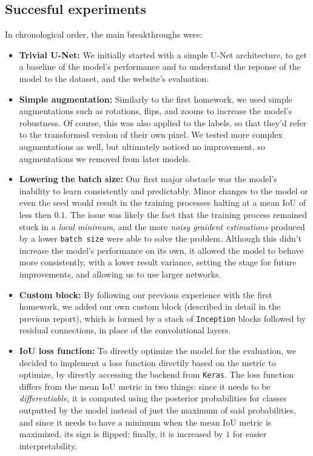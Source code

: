\documentclass[11pt]{article}
\begin{document}
\begin{multicols}{2}
      \section{Succesful experiments}
      \label{sec:succ_experiments}
      In chronological order, the main breakthroughs were:
      \begin{itemize}[leftmargin=*]
            \setlength\itemsep{0em}
            \item \textbf{Trivial U-Net:} We initially started with a simple U-Net architecture, to get a baseline of the model's performance and to understand the reponse of the model to the dataset, and the website's evaluation.
            \item \textbf{Simple augmentation:} Similarly to the first homework, we used simple augmentations such as rotations, flips, and zooms to increase the model's robustness. Of course, this was also applied to the labels, so that they'd refer to the transformed version of their own pixel. We tested more complex augmentations as well, but ultimately noticed no improvement, so augmentations we removed from later models.
            \item \textbf{Lowering the batch size:} Our first major obstacle was the model's inability to learn consistently and predictably. Minor changes to the model or even the seed would result in the training processes halting at a mean IoU of less then $0.1$. The issue was likely the fact that the training process remained stuck in a \textit{local minimum}, and the more \textit{noisy graident estimations} produced by a lower \texttt{batch size} were able to solve the problem. Although this didn't increase the model's performance on its own, it allowed the model to behave more consistently, with a lower result variance, setting the stage for future improvements, and allowing us to use larger networks.
            \item \textbf{Custom block:} By following our previous experience with the first homework, we added our own custom block (described in detail in the previous report), which is formed by a stack of \texttt{Inception} blocks followed by residual connections, in place of the convolutional layers.
            \item \textbf{IoU loss function:} To directly optimize the model for the evaluation, we decided to implement a loss function directily based on the metric to optimize, by directly accessing the backend from \texttt{Keras}. The loss function differs from the mean IoU metric in two things: since it needs to be \textit{differentiable}, it is computed using the posterior probabilities for classes outputted by the model instead of just the maximum of said probabilities, and since it needs to have a minimum when the mean IoU metric is maximized, its sign is flipped; finally, it is increased by $1$ for easier interpretability.

\end{itemize}
\end{multicols}
\end{document}
